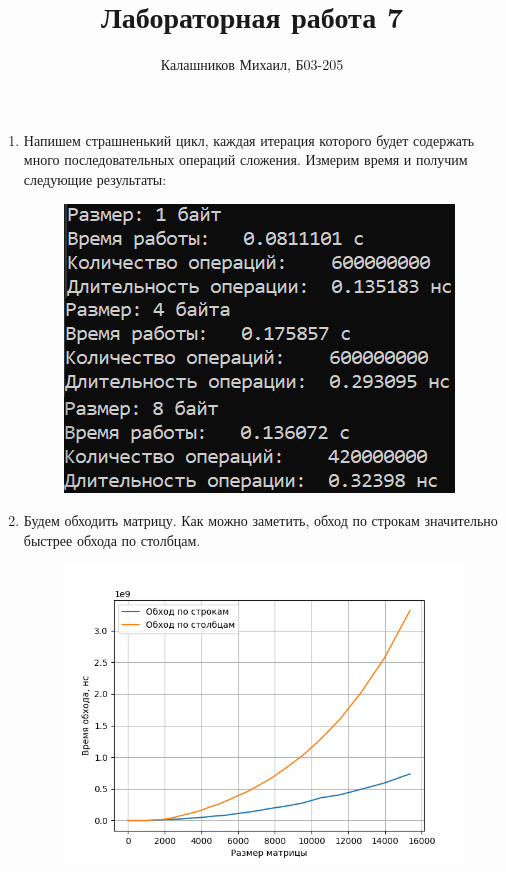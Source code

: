 \documentclass[a4paper,12pt]{article}
\title{Лабораторная работа 7}
\author{Калашников Михаил, Б03-205}
\date{}
\begin{document}

\begin{enumerate}

\setcounter{enumi}{0}

\item Напишем страшненький цикл, каждая итерация которого будет содержать много последовательных операций сложения. Измерим время и получим следующие результаты:

\begin{figure}[H]
  \centering
  \includegraphics[width=1\linewidth]{images/asm7_1.png}
\end{figure}

\item Будем обходить матрицу. Как можно заметить, обход по строкам значительно быстрее обхода по столбцам.

\begin{figure}[H]
  \centering
  \includegraphics[width=1\linewidth]{images/asm7_2.png}
\end{figure}


\end{enumerate}
\end{document}
